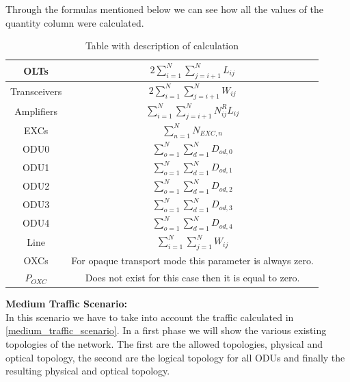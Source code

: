 Through the formulas mentioned below we can see how all the values of the quantity column were calculated.

\begin{table}[H]
\centering
\begin{tabular}{|| c | c ||}
 \hline
 OLTs & \(\displaystyle 2 \sum_{i=1}^{N}\sum_{j=i+1}^{N} L_{ij} \) \\ \hline
 Transceivers & \(\displaystyle 2 \sum_{i=1}^{N}\sum_{j=i+1}^{N} W_{ij} \) \\ \hline
 Amplifiers & \(\displaystyle \sum_{i=1}^{N}\sum_{j=i+1}^{N} N^R_{ij} L_{ij} \) \\ \hline
 EXCs & \(\displaystyle \sum_{n=1}^N N_{EXC,n} \) \\ \hline
 ODU0 & \(\displaystyle \sum_{o=1}^{N}\sum_{d=1}^{N} D_{od,0} \) \\ \hline
 ODU1 & \(\displaystyle \sum_{o=1}^{N}\sum_{d=1}^{N} D_{od,1} \) \\ \hline
 ODU2 & \(\displaystyle \sum_{o=1}^{N}\sum_{d=1}^{N} D_{od,2} \)\\ \hline
 ODU3 & \(\displaystyle \sum_{o=1}^{N}\sum_{d=1}^{N} D_{od,3} \) \\ \hline
 ODU4 & \(\displaystyle \sum_{o=1}^{N}\sum_{d=1}^{N} D_{od,4} \) \\ \hline
 Line & \(\displaystyle \sum_{i=1}^{N}\sum_{j=1}^{N} W_{ij} \) \\ \hline
 OXCs & For opaque transport mode this parameter is always zero. \\ \hline
 $P_{OXC}$ & Does not exist for this case then it is equal to zero. \\
 \hline
 \end{tabular}
\caption{Table with description of calculation}
\label{formulas_opaque_surv_ref_low_heuristic}
\end{table}

\newpage
\textbf{Medium Traffic Scenario:}\\

In this scenario we have to take into account the traffic calculated in \ref{medium_traffic_scenario}. In a first phase we will show the various existing topologies of the network. The first are the allowed topologies, physical and optical topology, the second are the logical topology for all ODUs and finally the resulting physical and optical topology.\\

